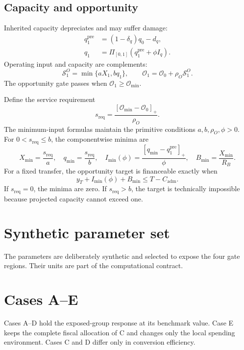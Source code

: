 \documentclass[11pt]{article}
\newcommand{\OO}{\mathcal O}
\begin{document}
\subsection{Capacity and opportunity}

Inherited capacity depreciates and may suffer damage:
\begin{align}
q_1^{\mathrm{pre}}&=(1-\delta_q)q_0-d_q,\\
q_1&=\Pi_{[0,1]}\!\left(q_1^{\mathrm{pre}}+\phi I_q\right).
\end{align}
Operating input and capacity are complements:
\begin{equation}
\mathcal S_1^O=\min\{aX_1,bq_1\},
\qquad
\OO_1=\OO_0+\rho_O\mathcal S_1^O.
\end{equation}
The opportunity gate passes when $\OO_1\geq\OO_{\min}$.

Define the service requirement
\[
s_{\mathrm{req}}=\frac{[\OO_{\min}-\OO_0]_+}{\rho_O}.
\]
The minimum-input formulas maintain the primitive conditions
$a,b,\rho_O,\phi>0$.
For $0<s_{\mathrm{req}}\leq b$, the componentwise minima are
\begin{equation}
X_{\min}=\frac{s_{\mathrm{req}}}{a},\quad
q_{\min}=\frac{s_{\mathrm{req}}}{b},\quad
I_{\min}(\phi)=\frac{[q_{\min}-q_1^{\mathrm{pre}}]_+}{\phi},\quad
B_{\min}=\frac{X_{\min}}{R_B}.
\end{equation}
For a fixed transfer, the opportunity target is financeable exactly when
\begin{equation}
y_T+I_{\min}(\phi)+B_{\min}\leq T-C_{\mathrm{adm}}.
\end{equation}
If $s_{\mathrm{req}}=0$, the minima are zero. If $s_{\mathrm{req}}>b$, the target
is technically impossible because projected capacity cannot exceed one.

\clearpage
\section{Synthetic parameter set}

The parameters are deliberately synthetic and selected to expose the four gate
regions. Their units are part of the computational contract.

\small

\normalsize

\clearpage
\section{Cases A--E}

Cases A--D hold the exposed-group response at its benchmark value. Case E keeps
the complete fiscal allocation of C and changes only the local spending
environment. Cases C and D differ only in conversion efficiency.
\end{document}
